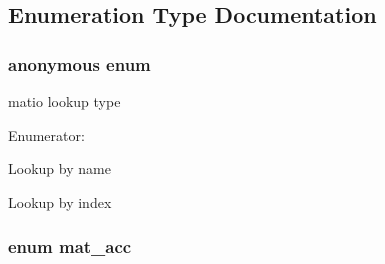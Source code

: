 \subsection{\-Enumeration \-Type \-Documentation}
\hypertarget{group__MAT_ga06fc87d81c62e9abb8790b6e5713c55b}{\subsubsection[{anonymous enum}]{\setlength{\rightskip}{0pt plus 5cm}anonymous enum}}\label{group__MAT_ga06fc87d81c62e9abb8790b6e5713c55b}
matio lookup type \begin{Desc}
\item[\-Enumerator\-: ]\par
\begin{description}
\item[{\em 
\hypertarget{group__MAT_gga06fc87d81c62e9abb8790b6e5713c55ba8938378c70879fe916177141cce0417e}{\-B\-Y\-\_\-\-N\-A\-M\-E}\label{group__MAT_gga06fc87d81c62e9abb8790b6e5713c55ba8938378c70879fe916177141cce0417e}
}]\-Lookup by name \item[{\em 
\hypertarget{group__MAT_gga06fc87d81c62e9abb8790b6e5713c55ba5f4d5606de1ec27f80f4a50186909005}{\-B\-Y\-\_\-\-I\-N\-D\-E\-X}\label{group__MAT_gga06fc87d81c62e9abb8790b6e5713c55ba5f4d5606de1ec27f80f4a50186909005}
}]\-Lookup by index \end{description}
\end{Desc}

\hypertarget{group__MAT_gaa9dcbc70f538af79bd557593ff6b5cdb}{
\subsubsection[{mat\-\_\-acc}]{\setlength{\rightskip}{0pt plus 5cm}enum {\bf mat\-\_\-acc}}}\label{group__MAT_gaa9dcbc70f538af79bd557593ff6b5cdb}


